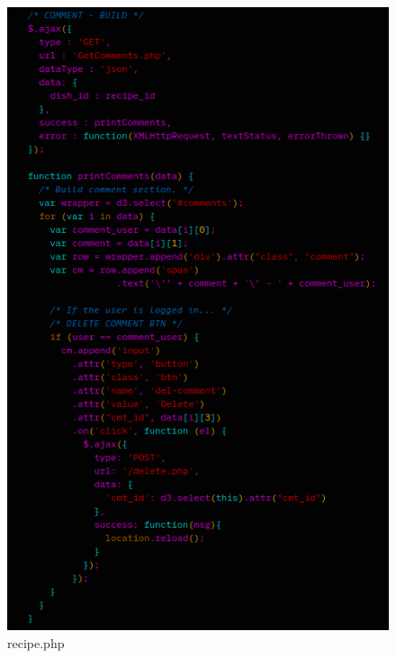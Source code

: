 \documentclass[a4paper]{scrartcl}
\begin{document}
\begin{figure}[H]
  \begin{center}
    \includegraphics[scale=0.9]{images/cmt_build.png}
    \caption{recipe.php}
    \label{fig:cmt_build}
  \end{center}
\end{figure}
\end{document}
